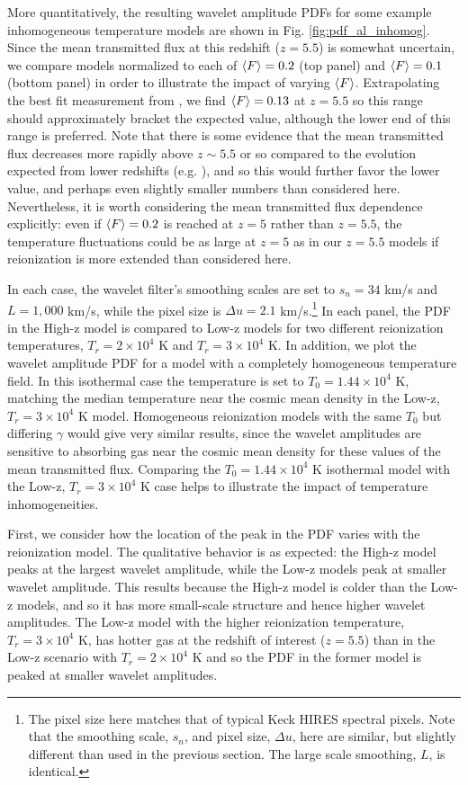 More quantitatively, the resulting wavelet amplitude PDFs for some example inhomogeneous temperature models are shown in Fig. \ref{fig:pdf_al_inhomog}. Since the 
mean transmitted flux at this redshift ($z=5.5$) is somewhat uncertain, we compare models normalized to each of $\langle F \rangle=0.2$ (top panel) and $\langle F \rangle=0.1$ (bottom panel) in order
to illustrate the impact of varying $\langle F \rangle$. Extrapolating the best fit measurement from \citep{Becker:2012aq}, we find
$\langle F \rangle=0.13$ at $z=5.5$ so this range should approximately bracket the expected value, although the lower end of this range
is preferred. Note that there is some evidence that the mean transmitted flux decreases more rapidly above $z \sim 5.5$ or so compared to the evolution
expected from lower redshifts (e.g. \citealt{Fan:2005es}), and so this would
further favor the lower value, and perhaps even slightly smaller numbers than considered here. Nevertheless, it is worth considering the mean transmitted
flux dependence explicitly: even if $\langle F \rangle=0.2$ is reached at $z=5$ rather than $z=5.5$, the temperature fluctuations could be as large at $z=5$ as in our
$z=5.5$ models if reionization is more extended than considered here. 

In each case, the wavelet filter's smoothing scales are set to $s_n = 34$ km/s and $L=1,000$ km/s, while
the pixel size is $\Delta u = 2.1$ km/s.\footnote{The pixel size here matches that of typical Keck HIRES spectral pixels. Note that the smoothing scale, $s_n$, and pixel size, $\Delta u$, here are similar, but slightly different than used
in the previous section. The large scale smoothing, $L$, is identical.} In each panel, the PDF in the High-z model is compared to Low-z models for
two different reionization temperatures, $T_r = 2 \times 10^4$ K and $T_r = 3 \times 10^4$ K. In addition, we plot the wavelet amplitude PDF for a model
with a completely homogeneous temperature field. In this isothermal case the temperature is set to $T_0 = 1.44 \times 10^4$ K, matching the median
temperature near the cosmic mean density in the Low-z, $T_r = 3 \times 10^4$ K model. Homogeneous reionization 
models with the same $T_0$ but differing
$\gamma$ would give very similar results, since the wavelet amplitudes 
are sensitive to absorbing gas near the cosmic mean density for these values of the mean transmitted flux.
Comparing the $T_0 = 1.44 \times 10^4$ K isothermal model with the Low-z, $T_r = 3 \times 10^4$ K case helps to illustrate the impact of temperature
inhomogeneities.

First, we consider how the location of the peak in the PDF varies with the reionization model. The qualitative behavior is as expected: the High-z model
peaks at the largest wavelet amplitude, while the Low-z models peak at smaller wavelet amplitude. This results because the High-z model is colder than
the Low-z models, and so it has more small-scale structure and hence higher wavelet amplitudes. The Low-z model with the higher reionization 
temperature, $T_r = 3 \times 10^4$ K, has hotter gas at the redshift of interest ($z=5.5$) than in the Low-z scenario with $T_r = 2 \times 10^4$ K
and so the PDF in the former model is peaked at smaller wavelet amplitudes. 


